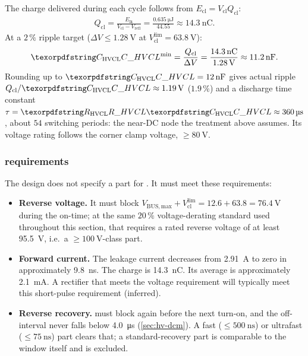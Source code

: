 The charge delivered during each cycle follows from
$E_{\mathrm{cl}}=V_{\mathrm{cl}}Q_{\mathrm{cl}}$:
\begin{align*}
  Q_{\mathrm{cl}} = \frac{E_{\mathrm{lk}}}{V_{\mathrm{cl}} - V_{\mathrm{refl}}}
    = \frac{\SI{0.635}{\micro\joule}}{44.55} \approx \SI{14.3}{\nano\coulomb}.
\end{align*}
At a $2\,\%$ ripple target ($\Delta V \le \SI{1.28}{\volt}$ at
$V_{\mathrm{cl}}^{\mathrm{lim}} = \SI{63.8}{\volt}$):
\begin{align*}
  \des{C}{HVCL}^{\min} = \frac{Q_{\mathrm{cl}}}{\Delta V}
    = \frac{\SI{14.3}{\nano\coulomb}}{\SI{1.28}{\volt}} \approx \SI{11.2}{\nano\farad}.
\end{align*}
Rounding up to $\des{C}{HVCL} = \SI{12}{\nano\farad}$ gives actual ripple
$Q_{\mathrm{cl}}/\des{C}{HVCL} \approx \SI{1.19}{\volt}$ ($1.9\,\%$) and a
discharge time constant $\tau = \des{R}{HVCL} \des{C}{HVCL} \approx
\SI{360}{\micro\second}$, about $54$ switching periods: the near-DC node the
treatment above assumes. Its voltage rating follows the corner clamp voltage,
$\ge\SI{80}{\volt}$.

\subsubsection{ requirements}

The design does not specify a part for . It must meet these
requirements:
\begin{itemize}[nosep]
  \item \textbf{Reverse voltage.} It must block $V_{\mathrm{BUS,max}} +
    V_{\mathrm{cl}}^{\mathrm{lim}} = 12.6 + 63.8 = \SI{76.4}{\volt}$ during the
    on-time; at the same $20\,\%$ voltage-derating standard used throughout
    this section, that requires a rated reverse voltage of at least
    \SI{95.5}{\volt}, i.e.\ a $\ge\SI{100}{\volt}$-class part.
  \item \textbf{Forward current.} The leakage current decreases from
    \SI{2.91}{\ampere} to zero in approximately \SI{9.8}{\nano\second}. The
    charge is \SI{14.3}{\nano\coulomb}. Its average is approximately
    \SI{2.1}{\milli\ampere}. A rectifier that meets the voltage requirement will
    typically meet this short-pulse requirement (inferred).
  \item \textbf{Reverse recovery.}  must block again before the
    next turn-on, and the off-interval never falls below
    \SI{4.0}{\micro\second} (\cref{sec:hv-dcm}). A fast
    ($\le\SI{500}{\nano\second}$) or ultrafast ($\le\SI{75}{\nano\second}$) part
    clears that; a standard-recovery part is comparable to the window itself and
    is excluded.
\end{itemize}

